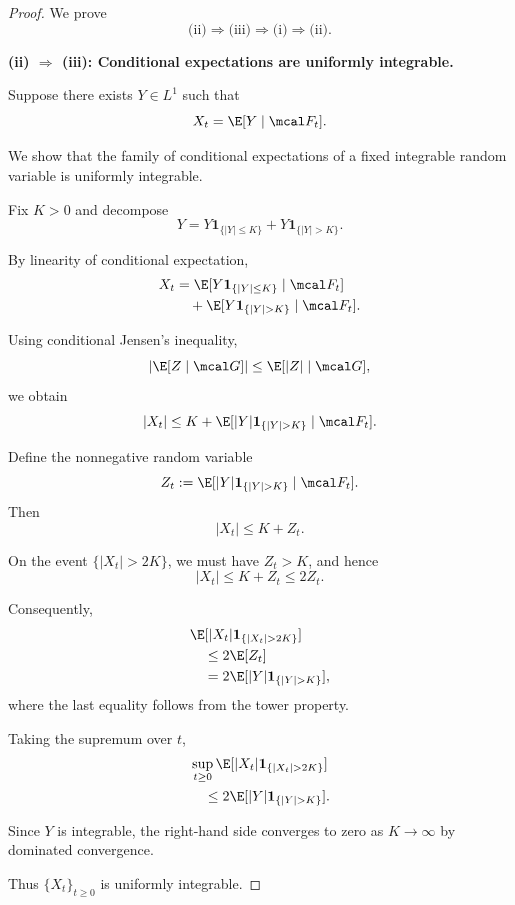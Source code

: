 \begin{proof}
We prove
\[
    \text{(ii)}\Rightarrow\text{(iii)}
    \Rightarrow\text{(i)}
    \Rightarrow\text{(ii)}.
\]

\medskip
\noindent
\textbf{(ii) $\Rightarrow$ (iii):
Conditional expectations are uniformly integrable.}

Suppose there exists $Y\in L^1$ such that
\[
    X_t=\E[Y\mid\mcal F_t].
\]

We show that the family of conditional expectations
of a fixed integrable random variable is uniformly
integrable.

Fix $K>0$ and decompose
\[
    Y=
    Y\mathbf1_{\{|Y|\leq K\}}
    +Y\mathbf1_{\{|Y|>K\}}.
\]

By linearity of conditional expectation,
\[
\begin{aligned}
    X_t
    &=
    \E[Y\mathbf1_{\{|Y|\leq K\}}\mid\mcal F_t]\\
    &\quad+
    \E[Y\mathbf1_{\{|Y|>K\}}\mid\mcal F_t].
\end{aligned}
\]

Using conditional Jensen's inequality,
\[
    |\E[Z\mid\mcal G]|
    \leq\E[|Z|\mid\mcal G],
\]
we obtain
\[
    |X_t|
    \leq K+
    \E[|Y|\mathbf1_{\{|Y|>K\}}\mid\mcal F_t].
\]

Define the nonnegative random variable
\[
    Z_t:=
    \E[|Y|\mathbf1_{\{|Y|>K\}}\mid\mcal F_t].
\]
Then
\[
    |X_t|\leq K+Z_t.
\]

On the event $\{|X_t|>2K\}$, we must have
$Z_t>K$, and hence
\[
    |X_t|\leq K+Z_t\leq2Z_t.
\]

Consequently,
\[
\begin{aligned}
    &\E[|X_t|\mathbf1_{\{|X_t|>2K\}}]\\
    &\quad\leq2\E[Z_t]\\
    &\quad=
    2\E[|Y|\mathbf1_{\{|Y|>K\}}],
\end{aligned}
\]
where the last equality follows from the tower
property.

Taking the supremum over $t$,
\[
\begin{aligned}
    &\sup_{t\geq0}
    \E[|X_t|\mathbf1_{\{|X_t|>2K\}}]\\
    &\quad\leq
    2\E[|Y|\mathbf1_{\{|Y|>K\}}].
\end{aligned}
\]

Since $Y$ is integrable, the right-hand side
converges to zero as $K\to\infty$ by dominated
convergence.

Thus $\{X_t\}_{t\geq0}$ is uniformly integrable.


\end{proof}
